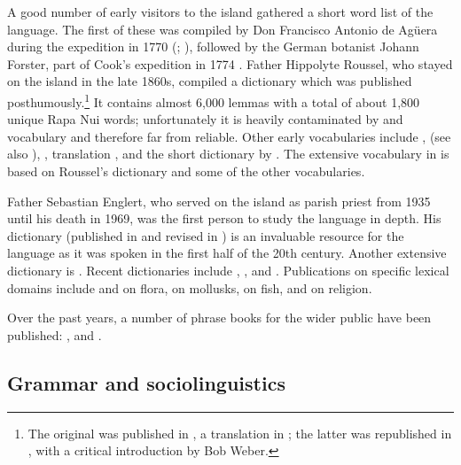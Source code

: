 A good number of early visitors to the island gathered a short word list of the language. The first of these was compiled by Don Francisco Antonio de Agüera during the  expedition in 1770 (\citealt{Ross1937}; \citealt{Corney1908}), followed by the German botanist Johann Forster, part of Cook’s expedition in 1774 \citep{Schuhmacher1977}. Father Hippolyte Roussel, who stayed on the island in the late 1860s, compiled a dictionary which was published posthumously.\footnote{\label{fn:24}The  original was published in \citet{Roussel1908}, a  translation in \citet{Roussel1917}; the latter was republished in \citet{Foerster2013}, with a critical introduction by Bob Weber.} It contains almost 6,000  lemmas with a total of about 1,800 unique Rapa Nui words; unfortunately it is heavily contaminated by  and  vocabulary \citep{Fischer1992} and therefore far from reliable. Other early vocabularies include \citet{Philippi1873}, \citet{Geiseler1883} (see also \citealt{AyresAyres1995}), \citet{Thomson1889},  translation \citet{Thomson1980}, \citet{Cooke1899} and the short dictionary by \citet{Martínez1913}. The extensive vocabulary in \citet{Churchill1912} is based on Roussel’s dictionary and some of the other vocabularies.

Father Sebastian Englert, who served on the island as parish priest from 1935 until his death in 1969, was the first person to study the language in depth. His dictionary (published in \citealt{Englert1948} and revised in \citealt{Englert1978}) is an invaluable resource for the language as it was spoken in the first half of the 20th century. Another extensive dictionary is \citet{Fuentes1960}. Recent dictionaries include \citet{Fedorova1988}, \citet{ConteOliveros2000}, \citet{HernándezSallés2001} and \citet{HotusChavez2008}. Publications on specific lexical domains include \citet{Gunckel1968} and \citet{RauchIbañez1996} on flora, \citet{PinochetCarte1980} on mollusks, \citet{RandallEgaña1984} on fish, and \citet{BierbachCain1996} on religion.

Over the past years, a number of phrase books for the wider public have been published: \citet{HaoaRapahangoLiller1996}, \citet{HotusTuki2001} and \citet{PaulyHukeAtán2008}.

\subsection{Grammar and sociolinguistics}\label{sec:1.5.2}

